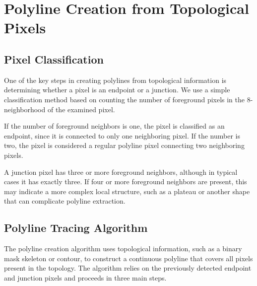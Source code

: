 
\captionsetup[algorithm]{
	labelfont=bf,
	justification=raggedright,
	singlelinecheck=false
}

\section{Polyline Creation from Topological Pixels}



\subsection{Pixel Classification}

One of the key steps in creating polylines from topological information is determining whether a pixel is an endpoint or a junction. We use a simple classification method based on counting the number of foreground pixels in the 8-neighborhood of the examined pixel.

If the number of foreground neighbors is one, the pixel is classified as an endpoint, since it is connected to only one neighboring pixel. If the number is two, the pixel is considered a regular polyline pixel connecting two neighboring pixels.


A junction pixel has three or more foreground neighbors, although in typical cases it has exactly three. If four or more foreground neighbors are present, this may indicate a more complex local structure, such as a plateau or another shape that can complicate polyline extraction.

\subsection{Polyline Tracing Algorithm}


The polyline creation algorithm uses topological information, such as a binary mask skeleton or contour, to construct a continuous polyline that covers all pixels present in the topology. The algorithm relies on the previously detected endpoint and junction pixels and proceeds in three main steps.

